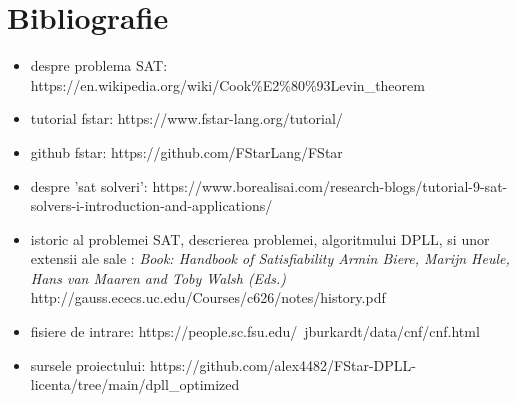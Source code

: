 \chapter*{Bibliografie} 



\begin{itemize}
	\item despre problema SAT:
	\newline https://en.wikipedia.org/wiki/Cook\%E2\%80\%93Levin\_theorem
    \item tutorial fstar:
    \newline https://www.fstar-lang.org/tutorial/
    \item github fstar:
    \newline https://github.com/FStarLang/FStar
    \item  despre 'sat solveri': \newline https://www.borealisai.com/research-blogs/tutorial-9-sat-solvers-i-introduction-and-applications/
    \item istoric al problemei SAT, descrierea problemei, algoritmului DPLL, si unor extensii ale sale : \newline
    \textit{Book: Handbook of Satisfiability
    Armin Biere, Marijn Heule, Hans van Maaren and Toby Walsh (Eds.)} \newline
    http://gauss.ececs.uc.edu/Courses/c626/notes/history.pdf
   	\item fisiere de intrare: https://people.sc.fsu.edu/~jburkardt/data/cnf/cnf.html
    \item sursele proiectului: \newline https://github.com/alex4482/FStar-DPLL-licenta/tree/main/dpll\_optimized
\end{itemize}